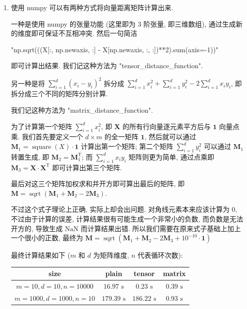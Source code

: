 \documentclass[answers]{exam}  %
\begin{document}
\begin{questions}
  \begin{solution}
    \begin{enumerate}
      \item

            使用 numpy 可以有两种方式将向量距离矩阵计算出来.

            一种是使用 numpy 的张量功能 (这里即为 3 阶张量, 即三维数组), 通过生成新的维度即可保证不互相冲突. 然后一句简洁

            "np.sqrt(((X[:, np.newaxis, :] - X[np.newaxis, :, :])**2).sum(axis=-1))"

            即可计算出结果. 我们记这种方法为 "tensor\_distance\_function".

            另一种是将 $\sum_{i=1}^{d}(x_i-y_i)^{2}$ 拆分成 $\sum_{i=1}^{d}x_i^{2} + \sum_{i=1}^{d}y_i^{2} - 2\sum_{i=1}^{d}x_iy_i$, 即拆分成三个不同的矩阵分别计算.

            我们记这种方法为 "matrix\_distance\_function".

            为了计算第一个矩阵 $\sum_{i=1}^{d}x_i^{2}$, 即 $\bm{X}$ 的所有行向量逐元素平方后与 $\bm{1}$ 向量点乘. 我们首先要定义一个 $d \times m$ 的全一矩阵 $\bm{1}$, 然后就可以通过 $\bm{M}_1 = \operatorname{square}(X) \cdot \bm{1}$ 计算出第一个矩阵; 第二个矩阵 $\sum_{i=1}^{d}y_i^{2}$ 可以通过 $\bm{M}_1$ 转置生成, 即 $\bm{M}_2 = \bm{M}_1^{\mathrm{T}}$; 而 $\sum_{i=1}^{d}x_i y_i$ 矩阵则更为简单, 通过点乘即 $\bm{M}_3 = \bm{X} \cdot \bm{X}^{\mathrm{T}}$ 即可计算出第三个矩阵.

            最后对这三个矩阵加权求和并开方即可算出最后的矩阵, 即 $\bm{M} = \operatorname{sqrt}(\bm{M}_1 + \bm{M}_2 - 2 \bm{M}_3)$.

            不过这个式子理论上正确, 实际上却会出问题. 对角线元素本来应该计算为 $0$, 不过由于计算的误差, 计算结果很有可能生成一个非常小的负数, 而负数是无法开方的, 导致生成 $\mathrm{NaN}$ 而计算结果出错. 所以我们需要在原来式子基础上加上一个很小的正数, 最终为 $\bm{M} = \operatorname{sqrt}(\bm{M}_1 + \bm{M}_2 - 2 \bm{M}_3 + 10^{-10} \cdot \bm{1})$

            最终计算结果如下 ($m$ 和 $d$ 为矩阵维度, $n$ 代表循环次数):

            \begin{table}[H]
              \centering
              \begin{tabular}{cccc}
                \hline
                size                         & plain              & tensor             & matrix           \\
                \hline
                $m = 10, d = 10, n = 10000$  & $16.97 \text{ s}$  & $0.23 \text{ s}$   & $0.39 \text{ s}$ \\
                $m = 1000, d = 1000, n = 10$ & $179.39 \text{ s}$ & $186.22 \text{ s}$ & $0.93 \text{ s}$ \\
                \hline
              \end{tabular}
            \end{table}


\end{enumerate}
\end{solution}
\end{questions}
\end{document}

